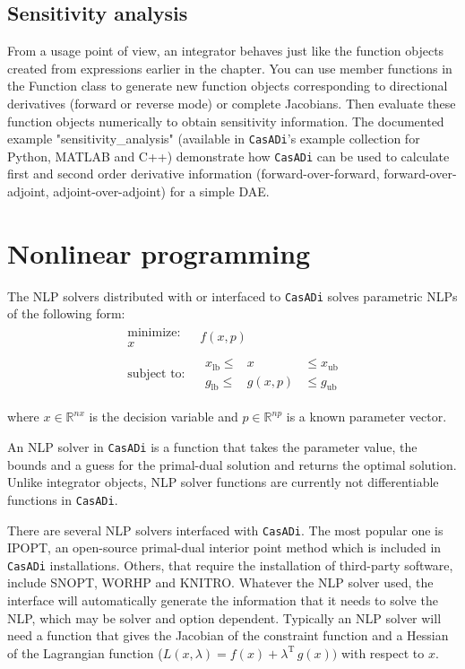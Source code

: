 \documentclass[a4paper,12pt]{book}
\newcommand{\CasADi}{\texttt{CasADi}\xspace}
\newcommand{\lb}{\text{lb}}
\newcommand{\ub}{\text{ub}}
\begin{document}
\subsection{Sensitivity analysis}
From a usage point of view, an integrator behaves just like the function objects created from expressions earlier in the chapter.
You can use member functions in the Function class to generate new function objects corresponding to directional derivatives (forward or reverse mode) or complete Jacobians. Then evaluate these function objects numerically to obtain sensitivity information. The documented example "sensitivity\_analysis" (available in \CasADi's example collection for Python, MATLAB and C++) demonstrate how \CasADi can be used to calculate first and second order derivative information (forward-over-forward, forward-over-adjoint, adjoint-over-adjoint) for a simple DAE.

\section{Nonlinear programming} \label{sec:nlpsol}
The NLP solvers distributed with or interfaced to \CasADi solves parametric NLPs of the following form:
\begin{equation} \label{eq:nlp}
\begin{array}{cc}
\begin{array}{c}
\text{minimize:} \\
x
\end{array}
&
f(x,p)
\\
\begin{array}{c}
\text{subject to:}
\end{array}
&
\begin{array}{rcl}
  x_{\lb} \le &  x   & \le x_{\ub} \\
  g_{\lb} \le &g(x,p)& \le g_{\ub}
\end{array}
\end{array}
\end{equation}

where $x \in \mathbb{R}^{nx}$ is the decision variable and $p \in \mathbb{R}^{np}$ is a known parameter vector.

An NLP solver in \CasADi is a function that takes the parameter value, the bounds and a guess for the primal-dual solution and returns the optimal solution. Unlike integrator objects, NLP solver functions are currently not differentiable functions in \CasADi.

There are several NLP solvers interfaced with \CasADi. The most popular one is IPOPT, an open-source primal-dual interior point method which is included in \CasADi installations. Others, that require the installation of third-party software, include SNOPT, WORHP and KNITRO. Whatever the NLP solver used, the interface will automatically generate the information that it needs to solve the NLP, which may be solver and option dependent. Typically an NLP solver will need a function that gives the Jacobian of the constraint function and a Hessian of the Lagrangian function ($L(x,\lambda) = f(x) + \lambda^{\text{T}} \, g(x))$ with respect to $x$.
\end{document}
